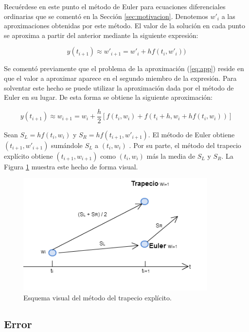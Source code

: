 \documentclass{article}
\theoremstyle{theorem-style}  %
\theoremstyle{definition-style}
\theoremstyle{example-style}
\begin{document}
		Recuérdese en este punto el método de Euler para ecuaciones diferenciales ordinarias que se comentó en la Sección \ref{sec:motivacion}. Denotemos $w'_i$ a las aproximaciones obtenidas por este método. El valor de la solución en cada punto se aproxima a partir del anterior mediante la siguiente expresión:
		
		\begin{equation*} \label{eq:euler}
			y(t_{i+1}) \approx w'_{i+1} = w'_i + h f(t_i,w'_i))
		\end{equation*}

		Se comentó previamente que el problema de la aproximación (\ref{eq:app}) reside en que el valor a aproximar aparece en el segundo miembro de la expresión. Para solventar este hecho se puede utilizar la aproximación dada por el método de Euler en su lugar. De esta forma se obtiene la siguiente aproximación:

		\begin{equation} \label{eq:app-exp}
			y(t_{i+1}) \approx w_{i+1} = w_i + \frac{h}{2} \left[f(t_i,w_i) + f(t_{i}+h, w_i + h f(t_i,w_i))\right]
		\end{equation}

		Sean $S_L = h f(t_i,w_i) $ y $S_R = h f(t_{i+1}, w'_{i+1})$. El método de Euler  obtiene $(t_{i+1}, w'_{i+1})$ sumándole $S_L$ a $(t_{i}, w_{i})$ . Por su parte, el método del trapecio explícito obtiene $(t_{i+1}, w_{i+1})$ como $(t_{i}, w_{i})$ más la media de $S_L$ y $S_R$. La Figura \ref{fig:trapecio-vs-euler} muestra este hecho de forma visual.
			
		\begin{figure}[H]
			\centering
			\includegraphics[width=10cm]{./Images/trapecio-vs-euler.png}
			\caption{Esquema visual del método del trapecio explícito.} 
			\label{fig:trapecio-vs-euler}
		\end{figure}

\subsection{Error} \label{sec:trapecio-explicito:error}
\end{document}
